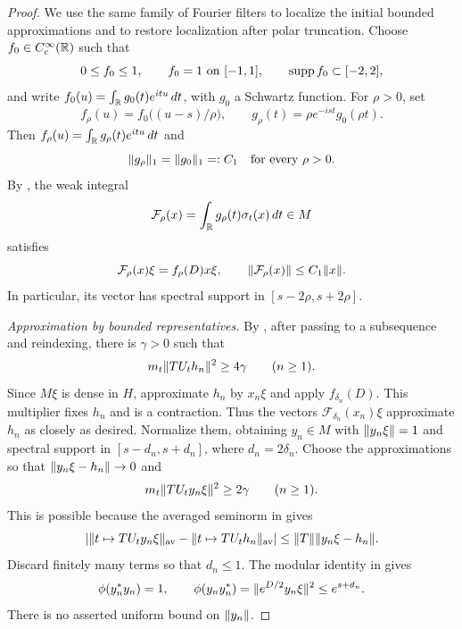 \begin{proof}
We use the same family of Fourier filters to localize the initial bounded
approximations and to restore localization after polar truncation.
Choose $f_0\in C_c^\infty(\mathbb R)$ such that
\[
 0\le f_0\le1,\qquad f_0=1\text{ on }[-1,1],\qquad
 \operatorname{supp} f_0\subset[-2,2],
\]
and write $f_0(u)=\int_\mathbb R g_0(t)e^{itu}\,dt$, with $g_0$ a Schwartz
function.  For $\rho>0$, set
\[
 f_\rho(u)=f_0\bigl((u-s)/\rho\bigr),\qquad
 g_\rho(t)=\rho e^{-ist}g_0(\rho t).
\]
Then $f_\rho(u)=\int_\mathbb R g_\rho(t)e^{itu}\,dt$ and
\begin{equation}
\label{eq:recovery-kernel}
 \lVert g_\rho\rVert_1=\lVert g_0\rVert_1=:C_1
 \quad\text{for every }\rho>0.
\end{equation}
By , the weak integral
\[
 \mathcal F_\rho(x)
   =\int_\mathbb R g_\rho(t)\sigma_t(x)\,dt\in M
\]
satisfies
\begin{equation}
\label{eq:recovery-filter}
 \mathcal F_\rho(x)\xi=f_\rho(D)x\xi,
 \qquad \lVert\mathcal F_\rho(x)\rVert\le C_1\lVert x\rVert.
\end{equation}
In particular, its vector has spectral support in
$[s-2\rho,s+2\rho]$.

\smallskip
\noindent\emph{Approximation by bounded representatives.}
By , after passing to a subsequence and
reindexing, there is $\gamma>0$ such that
\[
 m_t\lVert TU_th_n\rVert^{2}\ge4\gamma\qquad(n\ge1).
\]
Since $M\xi$ is dense in $H$, approximate $h_n$ by $x_n\xi$ and apply
$f_{\delta_n}(D)$.  This multiplier fixes $h_n$ and is a contraction.
Thus the vectors $\mathcal F_{\delta_n}(x_n)\xi$ approximate $h_n$ as
closely as desired.  Normalize them, obtaining $y_n\in M$ with
$\lVert y_n\xi\rVert=1$ and spectral support in
$[s-d_n,s+d_n]$, where $d_n=2\delta_n$.  Choose the approximations so that
$\lVert y_n\xi-h_n\rVert\to0$ and
\begin{equation}
\label{eq:recovery-defect}
 m_t\lVert TU_ty_n\xi\rVert^{2}\ge2\gamma\qquad(n\ge1).
\end{equation}
This is possible because the averaged seminorm in
 gives
\[
 \lvert\lVert t\mapsto TU_ty_n\xi\rVert_{\mathrm{av}}
       -\lVert t\mapsto TU_th_n\rVert_{\mathrm{av}}\rvert
 \le\lVert T\rVert\lVert y_n\xi-h_n\rVert.
\]
Discard finitely many terms so that $d_n\le1$.  The modular identity
in  gives
\begin{equation}
\label{eq:recovery-two-masses}
 \phi(y_n^*y_n)=1,\qquad
 \phi(y_ny_n^*)=\lVert e^{D/2}y_n\xi\rVert^{2}\le e^{s+d_n}.
\end{equation}
There is no asserted uniform bound on $\lVert y_n\rVert$.


\end{proof}
